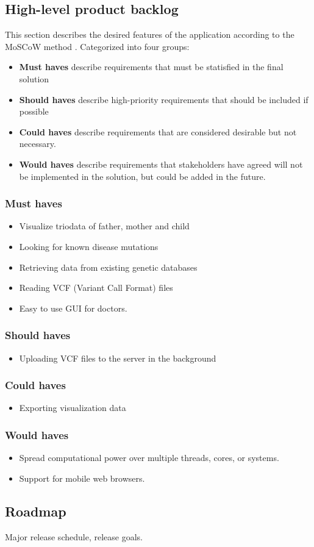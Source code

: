 \subsection{High-level product backlog}
This section describes the desired features of the application according to the MoSCoW method \cite{brennan2009guide}. Categorized into four groups:
\begin{itemize}
\item \textbf{Must haves} describe requirements that must be statisfied in the final solution
\item \textbf{Should haves} describe high-priority requirements that should be included if possible
\item \textbf{Could haves} describe requirements that are considered desirable but not necessary.
\item \textbf{Would haves} describe requirements that stakeholders have agreed will not be implemented in the solution, but could be added in the future.
\end{itemize}

\subsubsection{Must haves}
\begin{itemize}
\item Visualize triodata of father, mother and child
\item Looking for known disease mutations
\item Retrieving data from existing genetic databases
\item Reading VCF (Variant Call Format) files 
\item Easy to use GUI for doctors.
\end{itemize}

\subsubsection{Should haves}
\begin{itemize}
\item Uploading VCF files to the server in the background
\end{itemize}


\subsubsection{Could haves}
\begin{itemize}
\item Exporting visualization data
\end{itemize}

\subsubsection{Would haves}
\begin{itemize}
\item Spread computational power over multiple threads, cores, or systems.
\item Support for mobile web browsers.
\end{itemize}

\subsection{Roadmap}
Major release schedule, release goals.